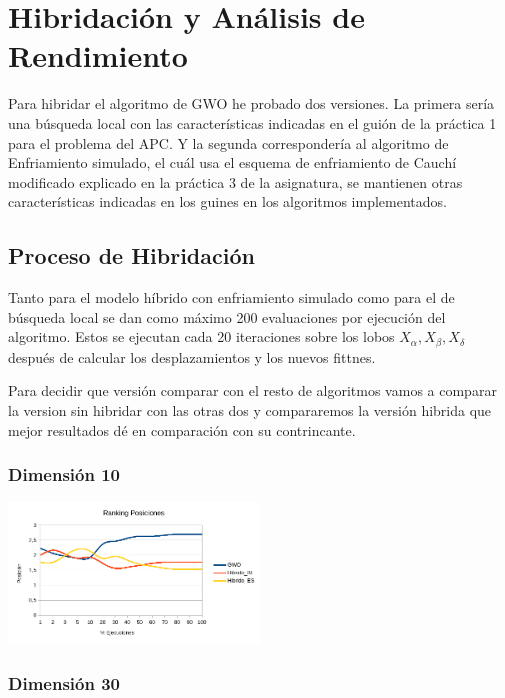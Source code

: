 \documentclass[a4paper, 12.5pt]{report}
\begin{document}
\section{Hibridación y Análisis de Rendimiento}

Para hibridar el algoritmo de GWO he probado dos versiones. La primera sería una búsqueda local con las características indicadas en el guión de la práctica 1 para el problema del APC. Y la segunda correspondería al algoritmo de Enfriamiento simulado, el cuál usa el esquema de enfriamiento de Cauchí modificado explicado en la práctica 3 de la asignatura, se mantienen otras características indicadas en los guines en los algoritmos implementados.



\subsection{Proceso de Hibridación}

Tanto para el modelo híbrido con enfriamiento simulado como para el de búsqueda local se dan como máximo 200 evaluaciones por ejecución del algoritmo. Estos se ejecutan cada 20 iteraciones sobre los lobos $X_\alpha,X_\beta,X_\delta$ después de calcular los desplazamientos y los nuevos fittnes.

Para decidir que versión comparar con el resto de algoritmos vamos a comparar la version sin hibridar con las otras dos y compararemos la versión hibrida que mejor resultados dé en comparación con su contrincante.


\subsubsection*{Dimensión 10}

\includegraphics*[width=0.5\textwidth]{Resultados/hibrido/Interno/D10/media_posicion.png} \label{img:media_posicion_D10_comparativa}



\subsubsection*{Dimensión 30}
\end{document}
